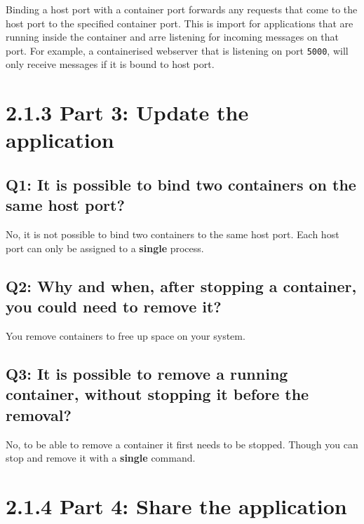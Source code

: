 \documentclass[
]{article}
\begin{document}
Binding a host port with a container port forwards any requests that
come to the host port to the specified container port. This is import
for applications that are running inside the container and arre
listening for incoming messages on that port. For example, a
containerised webserver that is listening on port \texttt{5000}, will
only receive messages if it is bound to host port.

\hypertarget{part-3-update-the-application}{%
\section{2.1.3 Part 3: Update the
application}\label{part-3-update-the-application}}

\hypertarget{q1-it-is-possible-to-bind-two-containers-on-the-same-host-port}{%
\subsection{Q1: It is possible to bind two containers on the same host
port?}\label{q1-it-is-possible-to-bind-two-containers-on-the-same-host-port}}

No, it is not possible to bind two containers to the same host port.
Each host port can only be assigned to a \textbf{single} process.

\hypertarget{q2-why-and-when-after-stopping-a-container-you-could-need-to-remove-it}{%
\subsection{Q2: Why and when, after stopping a container, you could need
to remove
it?}\label{q2-why-and-when-after-stopping-a-container-you-could-need-to-remove-it}}

You remove containers to free up space on your system.

\hypertarget{q3-it-is-possible-to-remove-a-running-container-without-stopping-it-before-the-removal}{%
\subsection{Q3: It is possible to remove a running container, without
stopping it before the
removal?}\label{q3-it-is-possible-to-remove-a-running-container-without-stopping-it-before-the-removal}}

No, to be able to remove a container it first needs to be stopped.
Though you can stop and remove it with a \textbf{single} command.

\hypertarget{part-4-share-the-application}{%
\section{2.1.4 Part 4: Share the
application}\label{part-4-share-the-application}}
\end{document}
